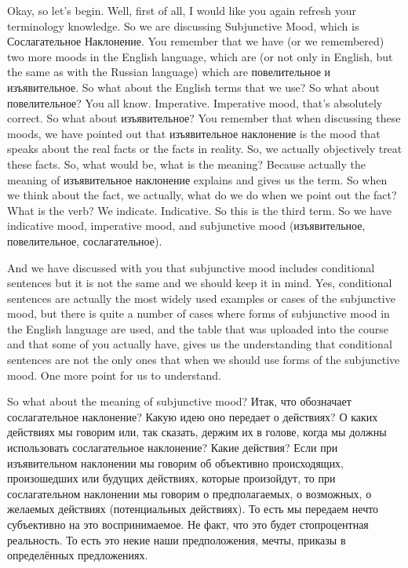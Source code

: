 \documentclass[main.tex]{subfiles}
\begin{document}
Okay, so let's begin.
Well, first of all, I would like you again refresh your terminology knowledge.
So we are discussing Subjunctive Mood, which is Сослагательное Наклонение.
You remember that we have (or we remembered) two more moods in the English language, which are (or not only in English, but the same as with the Russian language) which are повелительное и изъявительное.
So what about the English terms that we use?
So what about повелительное? You all know.
Imperative.
Imperative mood, that's absolutely correct.
So what about изъявительное?
You remember that when discussing these moods, we have pointed out that изъявительное наклонение is the mood that speaks about the real facts or the facts in reality.
So, we actually objectively treat these facts.
So, what would be, what is the meaning?
Because actually the meaning of изъявительное наклонение explains and gives us the term.
So when we think about the fact, we actually, what do we do when we point out the fact?
What is the verb?
We indicate.
Indicative.
So this is the third term.
So we have indicative mood, imperative mood, and subjunctive mood (изъявительное, повелительное, сослагательное).

And we have discussed with you that subjunctive mood includes conditional sentences but it is not the same and we should keep it in mind.
Yes, conditional sentences are actually the most widely used examples or cases of the subjunctive mood, but there is quite a number of cases where forms of subjunctive mood in the English language are used, and the table that was uploaded into the course and that some of you actually have, gives us the understanding that conditional sentences are not the only ones that when we should use forms of the subjunctive mood.
One more point for us to understand.

So what about the meaning of subjunctive mood?
Итак, что обозначает сослагательное наклонение?
Какую идею оно передает о действиях?
О каких действиях мы говорим или, так сказать, держим их в голове, когда мы должны использовать сослагательное наклонение?
Какие действия?
Если при изъявительном наклонении мы говорим об объективно происходящих, произошедших или будущих действиях, которые произойдут, то при сослагательном наклонении мы говорим о предполагаемых, о возможных, о желаемых действиях (потенциальных действиях).
То есть мы передаем нечто субъективно на это воспринимаемое.
Не факт, что это будет стопроцентная реальность.
То есть это некие наши предположения, мечты, приказы в определённых предложениях.
\end{document}
